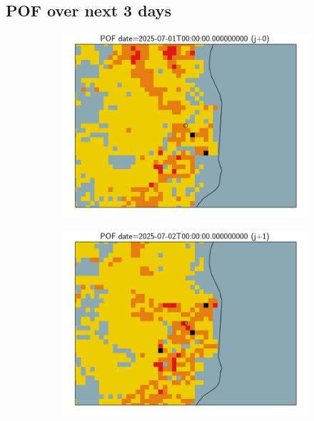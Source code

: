 \documentclass{article}
\begin{document}
\subsection*{POF over next 3 days}
\vspace{-1em}
\begin{figure}[H]
    \centering
    \begin{subfigure}[b]{0.31\textwidth}
        \centering
        \includegraphics[width=\linewidth]{pof_184_j0.png} %
    \end{subfigure}
    \begin{subfigure}[b]{0.31\textwidth}
        \centering
        \includegraphics[width=\linewidth]{pof_184_j1.png} %

\end{subfigure}
\end{figure}
\end{document}
